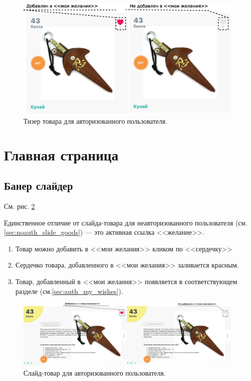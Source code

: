         
            \begin{figure}
                \center
                \includegraphics[width=170mm]{04_auth_funcs/figures/03.eps}
                \caption{Тизер товара для авторизованного пользователя.}
                \label{fig:auth_tizer}
            \end{figure}
        
        
    \section{Главная страница}
        \subsection{Банер слайдер}
        
            См. рис. \ref{fig:auth_slide_goods}

            Единственное отличие от слайда-товара для неавторизованного пользователя (см. \ref{sec:noauth_slide_goods})
            --- это активная ссылка <<желание>>.
            
            \begin{enumerate}
                \item Товар можно добавить в <<мои желания>> кликом по <<сердечку>>
                \item Сердечко товара, добавленного в <<мои желания>> заливается красным.
                \item Товар, добавленный в <<мои желания>> появляется в соответствующем разделе (см.\ref{sec:auth_my_wishes}).
            \end{enumerate}
            
            \begin{figure}
                \center
                \includegraphics[width=170mm]{04_auth_funcs/figures/04.eps}
                \caption{Слайд-товар для авторизованного пользователя.}
                \label{fig:auth_slide_goods}
            \end{figure}
        
